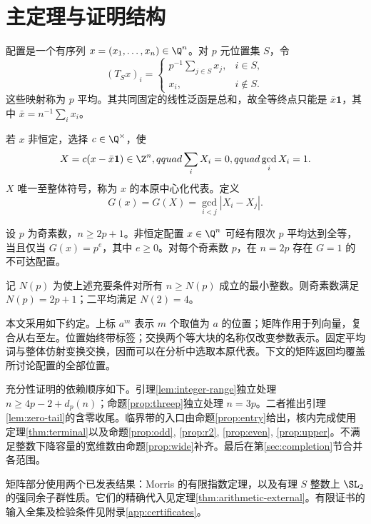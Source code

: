 \section{主定理与证明结构}\label{sec:main}
配置是一个有序列 $x=(x_1,\ldots,x_n)\in\Q^n$。对 $p$ 元位置集 $S$，令
\[
(T_Sx)_i=\begin{cases}p^{-1}\sum_{j\in S}x_j,&i\in S,\\x_i,&i\notin S.\end{cases}
\]
这些映射称为 $p$ 平均。其共同固定的线性泛函是总和，故全等终点只能是 $\bar x\mathbf1$，其中 $\bar x=n^{-1}\sum_i x_i$。

若 $x$ 非恒定，选择 $c\in\Q^\times$，使
\[
X=c(x-\bar x\mathbf1)\in\Z^n,qquad \sum_iX_i=0,qquad \gcd_iX_i=1.
\]
$X$ 唯一至整体符号，称为 $x$ 的本原中心化代表。定义
\begin{equation}\label{eq:G}
G(x)=G(X)=\gcd_{i<j}|X_i-X_j|.
\end{equation}

\begin{theorem}\label{thm:prime}
设 $p$ 为奇素数，$n\ge2p+1$。非恒定配置 $x\in\Q^n$ 可经有限次 $p$ 平均达到全等，当且仅当 $G(x)=p^e$，其中 $e\ge0$。对每个奇素数 $p$，在 $n=2p$ 存在 $G=1$ 的不可达配置。
\end{theorem}

\begin{corollary}\label{cor:threshold}
记 $N(p)$ 为使上述充要条件对所有 $n\ge N(p)$ 成立的最小整数。则奇素数满足 $N(p)=2p+1$；二平均满足 $N(2)=4$。
\end{corollary}

本文采用如下约定。上标 $a^m$ 表示 $m$ 个取值为 $a$ 的位置；矩阵作用于列向量，复合从右至左。位置始终带标签；交换两个等大块的名称仅改变参数表示。固定平均词与整体仿射变换交换，因而可以在分析中选取本原代表。下文的矩阵返回均覆盖所讨论配置的全部位置。

充分性证明的依赖顺序如下。引理\ref{lem:integer-range}独立处理 $n\ge4p-2+d_p(n)$；命题\ref{prop:threep}独立处理 $n=3p$。二者推出引理\ref{lem:zero-tail}的含零收尾。临界带的入口由命题\ref{prop:entry}给出，核内完成使用定理\ref{thm:terminal}以及命题\ref{prop:odd}, \ref{prop:r2}, \ref{prop:even}, \ref{prop:upper}。不满足整数下降容量的宽维数由命题\ref{prop:wide}补齐。最后在第\ref{sec:completion}节合并各范围。

矩阵部分使用两个已发表结果：Morris 的有限指数定理\cite[Theorem 6.1(2)]{morris}，以及有理 $S$ 整数上 $\SL_2$ 的强同余子群性质\cite{serre,prasad}。它们的精确代入见定理\ref{thm:arithmetic-external}。有限证书的输入全集及检验条件见附录\ref{app:certificates}。

